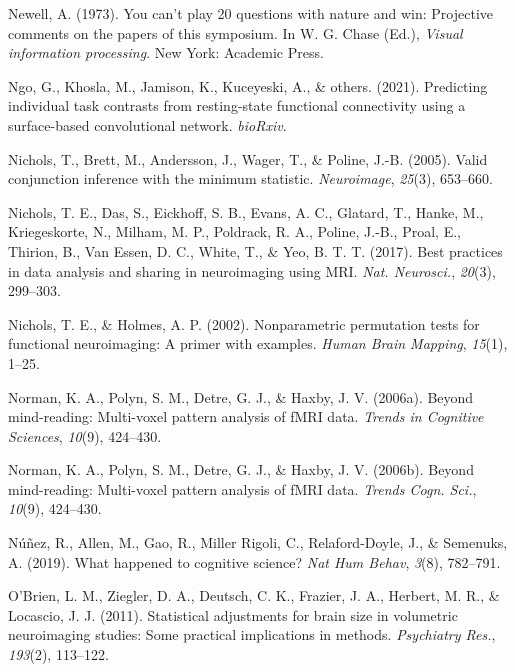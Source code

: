 \documentclass[11pt,american,]{memoir} %
\begin{document}
\leavevmode\hypertarget{ref-Newell1973-no}{}%
Newell, A. (1973). You can't play 20 questions with nature and win: Projective comments on the papers of this symposium. In W. G. Chase (Ed.), \emph{Visual information processing}. New York: Academic Press.

\leavevmode\hypertarget{ref-Ngo2021-kf}{}%
Ngo, G., Khosla, M., Jamison, K., Kuceyeski, A., \& others. (2021). Predicting individual task contrasts from resting-state functional connectivity using a surface-based convolutional network. \emph{bioRxiv}.

\leavevmode\hypertarget{ref-nichols2005valid}{}%
Nichols, T., Brett, M., Andersson, J., Wager, T., \& Poline, J.-B. (2005). Valid conjunction inference with the minimum statistic. \emph{Neuroimage}, \emph{25}(3), 653--660.

\leavevmode\hypertarget{ref-Nichols2017-ze}{}%
Nichols, T. E., Das, S., Eickhoff, S. B., Evans, A. C., Glatard, T., Hanke, M., Kriegeskorte, N., Milham, M. P., Poldrack, R. A., Poline, J.-B., Proal, E., Thirion, B., Van Essen, D. C., White, T., \& Yeo, B. T. T. (2017). Best practices in data analysis and sharing in neuroimaging using MRI. \emph{Nat. Neurosci.}, \emph{20}(3), 299--303.

\leavevmode\hypertarget{ref-nichols2002nonparametric}{}%
Nichols, T. E., \& Holmes, A. P. (2002). Nonparametric permutation tests for functional neuroimaging: A primer with examples. \emph{Human Brain Mapping}, \emph{15}(1), 1--25.

\leavevmode\hypertarget{ref-norman2006beyond}{}%
Norman, K. A., Polyn, S. M., Detre, G. J., \& Haxby, J. V. (2006a). Beyond mind-reading: Multi-voxel pattern analysis of fMRI data. \emph{Trends in Cognitive Sciences}, \emph{10}(9), 424--430.

\leavevmode\hypertarget{ref-Norman2006-bt}{}%
Norman, K. A., Polyn, S. M., Detre, G. J., \& Haxby, J. V. (2006b). Beyond mind-reading: Multi-voxel pattern analysis of fMRI data. \emph{Trends Cogn. Sci.}, \emph{10}(9), 424--430.

\leavevmode\hypertarget{ref-Nunez2019-lh}{}%
Núñez, R., Allen, M., Gao, R., Miller Rigoli, C., Relaford-Doyle, J., \& Semenuks, A. (2019). What happened to cognitive science? \emph{Nat Hum Behav}, \emph{3}(8), 782--791.

\leavevmode\hypertarget{ref-OBrien2011-lj}{}%
O'Brien, L. M., Ziegler, D. A., Deutsch, C. K., Frazier, J. A., Herbert, M. R., \& Locascio, J. J. (2011). Statistical adjustments for brain size in volumetric neuroimaging studies: Some practical implications in methods. \emph{Psychiatry Res.}, \emph{193}(2), 113--122.
\end{document}

